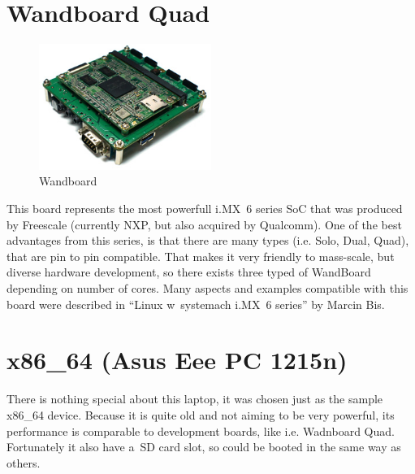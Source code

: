 \documentclass[printmode]{mgr}
\begin{document}
\section{Wandboard Quad}

\begin{figure}[htbp]
  \centering
    \includegraphics[width=0.5\textwidth]{wandboard-front.jpg}
  \caption{Wandboard}
  \label{fig:devboard-wandboard}
\end{figure}

This board represents the most powerfull i.MX~6 series SoC that was produced by Freescale (currently NXP, but also acquired by Qualcomm).
One of the best advantages from this series, is that there are many types (i.e. Solo, Dual, Quad), that are pin to pin compatible.
That makes it very friendly to mass-scale, but diverse hardware development, so there exists three typed of WandBoard depending on number of cores.
Many aspects and examples compatible with this board were described in ``Linux w~systemach i.MX~6 series'' by Marcin Bis.\cite{book:lws-imx6}



\section{x86\_64 (Asus Eee PC 1215n)}

There is nothing special about this laptop, it was chosen just as the sample x86\_64 device. Because it is quite old and not aiming to be very powerful, its performance is comparable to development boards, like i.e. Wadnboard Quad. Fortunately it also have a~SD card slot, so could be booted in the same way as others.
\end{document}
